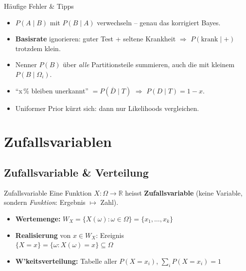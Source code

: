 \documentclass[a4paper, fontsize=7pt]{scrartcl}
\def\R{\mathbb{R}}  %
\begin{document}
\begin{subbox}{Häufige Fehler \& Tipps}
\begin{itemize}
    \item $P(A \mid B)$ mit $P(B \mid A)$ verwechseln -- genau das
          korrigiert Bayes.
    \item \textbf{Basisrate} ignorieren: guter Test + seltene Krankheit
          $\Rightarrow$ $P(\text{krank} \mid +)$ trotzdem klein.
    \item Nenner $P(B)$ über \emph{alle} Partitionsteile summieren, auch
          die mit kleinem $P(B \mid \Omega_i)$.
    \item ``x\,\% bleiben unerkannt'' $= P(\overline{D} \mid T)$
          $\Rightarrow$ $P(D \mid T) = 1 - x$.
    \item Uniformer Prior kürzt sich: dann nur Likelihoods vergleichen.
\end{itemize}
\end{subbox}

\section{Zufallsvariablen}

\subsection{Zufallsvariable \& Verteilung}

\begin{mainbox}{Zufallsvariable}
Eine Funktion $X : \Omega \to \R$ heisst \textbf{Zufallsvariable}
(keine Variable, sondern \emph{Funktion}: Ergebnis $\mapsto$ Zahl).
\begin{itemize}
    \item \textbf{Wertemenge:} $W_X = \{X(\omega) : \omega \in \Omega\}
          = \{x_1, \ldots, x_k\}$
    \item \textbf{Realisierung} von $x \in W_X$: Ereignis\\
          $\{X = x\} = \{\omega : X(\omega) = x\} \subseteq \Omega$
    \item \textbf{W'keitsverteilung:} Tabelle aller $P(X = x_i)$,
          $\sum_i P(X = x_i) = 1$
\end{itemize}
\end{mainbox}
\end{document}
